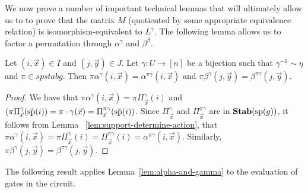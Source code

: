 \documentclass[../paper.tex]{subfiles}
\begin{document}


We now prove a number of important technical lemmas that will ultimately allow
us to to prove that the matrix $M$ (quotiented by some appropriate equivalence
relation) is isomorphism-equivalent to $L^{\gamma}$. The following lemma
allows us to factor a permutation through $\alpha^{\gamma}$ and $\beta^{\beta}$.

\begin{lem}
\label{lem:alpha-and-gamma}
	Let $(i,\vec{x}) \in I$ and $(j, \vec{y}) \in J$. Let $\gamma: U \rightarrow
	[n]$ be a bijection such that $\gamma^{-1} \sim \eta$ and $\pi \in spstab{g}$.
	Then $\pi \alpha^{\gamma}(i, \vec{x}) = \alpha^{\pi \gamma}(i, \vec{x})$ and
	$\pi \beta^{\gamma}(j, \vec{y}) = \beta^{\pi \gamma}(j, \vec{y})$.
\end{lem}
\begin{proof}
	We have that $\pi \alpha^{\gamma}(i, \vec{x}) = \pi \Pi^{\gamma}_{\vec{x}}(i)$
	and $(\pi \Pi^{\gamma}_{\vec{x}}(\vec{\text{sp}}(i)) = \pi \cdot \gamma (\vec{x})
	= \Pi^{\pi \gamma}_{\vec{x}}(\vec{\text{sp}}(i))$. Since $\Pi^{\gamma}_{\vec{x}}$
	and $\Pi^{\pi \gamma}_{\vec{x}}$ are in $\text{\textbf{Stab}} (\text{sp} (g))$, it follows from Lemma
	~\ref{lem:support-determine-action}, that $\pi \alpha^{\gamma}(i, \vec{x}) =
	\pi \Pi^{\gamma}_{\vec{x}} (i) = \Pi^{\pi \gamma}_{\vec{x}}(i) = \alpha^{\pi
		\gamma}(i, \vec{x})$. Similarly, $\pi \beta^{\gamma}(j, \vec{y}) =
	\beta^{\pi \gamma} (j, \vec{y})$.
\end{proof}

The following result applies Lemma~\ref{lem:alpha-and-gamma} to the evaluation
of gates in the circuit.
\end{document}

